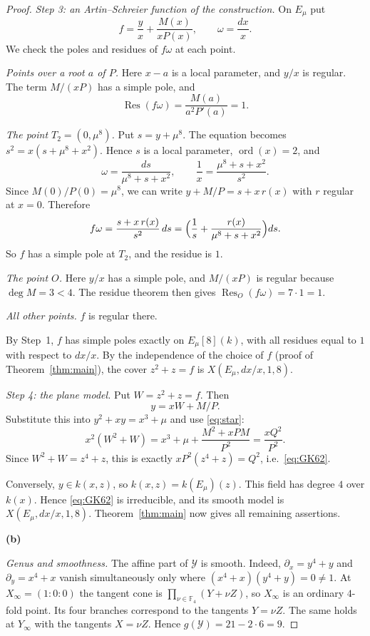 \documentclass[11pt]{article}
\theoremstyle{remark}
\newcommand{\Res}{\operatorname{Res}}
\newcommand{\F}{\mathbb F}
\begin{document}
\begin{proof}
\smallskip
\emph{Step 3: an Artin--Schreier function of the construction.}
On $E_\mu$ put
\[
 f=\frac yx+\frac{M(x)}{xP(x)},\qquad \omega=\frac{dx}{x}.
\]
We check the poles and residues of $f\omega$ at each point.

\emph{Points over a root $a$ of $P$.} Here $x-a$ is a local parameter,
and $y/x$ is regular. The term $M/(xP)$ has a simple pole, and
\[
 \Res(f\omega)=\frac{M(a)}{a^2P'(a)}=1 .
\]

\emph{The point $T_2=(0,\mu^8)$.} Put $s=y+\mu^8$. The equation becomes
$s^2=x(s+\mu^8+x^2)$. Hence $s$ is a local parameter,
$\operatorname{ord}(x)=2$, and
\[
 \omega=\frac{ds}{\mu^8+s+x^2},\qquad
 \frac1x=\frac{\mu^8+s+x^2}{s^2}.
\]
Since $M(0)/P(0)=\mu^8$, we can write
$y+M/P=s+x\,r(x)$ with $r$ regular at $x=0$. Therefore
\[
 f\omega=\frac{s+x\,r(x)}{s^2}\,ds
 =\Bigl(\frac1s+\frac{r(x)}{\mu^8+s+x^2}\Bigr)ds .
\]
So $f$ has a simple pole at $T_2$, and the residue is $1$.

\emph{The point $O$.} Here $y/x$ has a simple pole, and $M/(xP)$ is
regular because $\deg M=3<4$. The residue theorem then gives
$\Res_O(f\omega)=7\cdot1=1$.

\emph{All other points.} $f$ is regular there.

By Step~1, $f$ has simple poles exactly on $E_\mu[8](k)$, with all
residues equal to $1$ with respect to $dx/x$. By the independence of the
choice of $f$ (proof of Theorem~\ref{thm:main}), the cover $z^2+z=f$ is
$X(E_\mu,dx/x,1,8)$.

\smallskip
\emph{Step 4: the plane model.}  Put $W=z^2+z=f$. Then
\[
 y=xW+M/P .
\]
Substitute this into $y^2+xy=x^3+\mu$ and use \eqref{eq:star}:
\[
 x^2(W^2+W)=x^3+\mu+\frac{M^2+xPM}{P^2}=\frac{xQ^2}{P^2}.
\]
Since $W^2+W=z^4+z$, this is exactly
$xP^2(z^4+z)=Q^2$, i.e.\ \eqref{eq:GK62}.

Conversely, $y\in k(x,z)$, so $k(x,z)=k(E_\mu)(z)$. This field has
degree $4$ over $k(x)$. Hence \eqref{eq:GK62} is irreducible, and its
smooth model is $X(E_\mu,dx/x,1,8)$. Theorem~\ref{thm:main} now gives all remaining assertions.

\medskip
\textbf{(b)}

\emph{Genus and smoothness.} The affine part of $\mathcal Y$ is smooth.
Indeed, $\partial_x=y^4+y$ and $\partial_y=x^4+x$ vanish simultaneously
only where $(x^4+x)(y^4+y)=0\neq1$. At $X_\infty=(1:0:0)$ the tangent
cone is $\prod_{\nu\in\F_4}(Y+\nu Z)$, so $X_\infty$ is an ordinary
$4$-fold point. Its four branches correspond to the tangents $Y=\nu Z$.
The same holds at $Y_\infty$ with the tangents $X=\nu Z$. Hence
$g(\mathcal Y)=21-2\cdot6=9$.


\end{proof}
\end{document}
